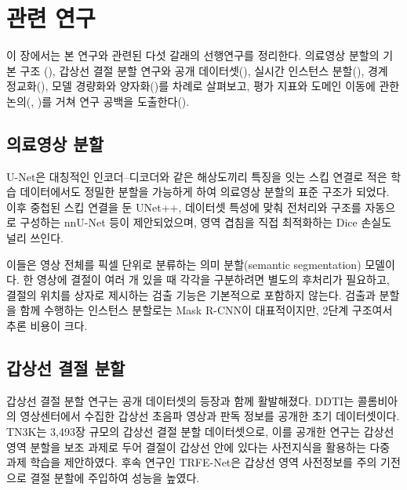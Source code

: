 \chapter{관련 연구}\label{ch:related}

이 장에서는 본 연구와 관련된 다섯 갈래의 선행연구를 정리한다. 의료영상 분할의 기본 구조
(), 갑상선 결절 분할 연구와 공개 데이터셋(),
실시간 인스턴스 분할(), 경계 정교화(),
모델 경량화와 양자화()를 차례로 살펴보고, 평가 지표와 도메인 이동에 관한
논의(, )를 거쳐 연구 공백을 도출한다().

\section{의료영상 분할}\label{sec:rw_medseg}

U-Net\citep{ronneberger2015unet}은 대칭적인 인코더--디코더와 같은 해상도끼리 특징을 잇는 스킵 연결로
적은 학습 데이터에서도 정밀한 분할을 가능하게 하여 의료영상 분할의 표준 구조가 되었다.
이후 중첩된 스킵 연결을 둔 UNet++\citep{zhou2018unetpp}, 데이터셋 특성에 맞춰 전처리와 구조를
자동으로 구성하는 nnU-Net\citep{isensee2021nnunet} 등이 제안되었으며, 영역 겹침을 직접 최적화하는
Dice 손실\citep{milletari2016vnet}도 널리 쓰인다.

이들은 영상 전체를 픽셀 단위로 분류하는 의미 분할(semantic segmentation) 모델이다. 한 영상에
결절이 여러 개 있을 때 각각을 구분하려면 별도의 후처리가 필요하고, 결절의 위치를 상자로
제시하는 검출 기능은 기본적으로 포함하지 않는다. 검출과 분할을 함께 수행하는 인스턴스 분할로는
Mask R-CNN\citep{he2017maskrcnn}이 대표적이지만, 2단계 구조여서 추론 비용이 크다.

\section{갑상선 결절 분할}\label{sec:rw_thyroid}

갑상선 결절 분할 연구는 공개 데이터셋의 등장과 함께 활발해졌다. DDTI\citep{pedraza2015ddti}는
콜롬비아의 영상센터에서 수집한 갑상선 초음파 영상과 판독 정보를 공개한 초기 데이터셋이다.
TN3K\citep{gong2021multitask}는 3,493장 규모의 갑상선 결절 분할 데이터셋으로, 이를 공개한 연구는
갑상선 영역 분할을 보조 과제로 두어 결절이 갑상선 안에 있다는 사전지식을 활용하는 다중 과제
학습을 제안하였다. 후속 연구인 TRFE-Net\citep{gong2023trfe}은 갑상선 영역 사전정보를 주의 기전으로
결절 분할에 주입하여 성능을 높였다.

